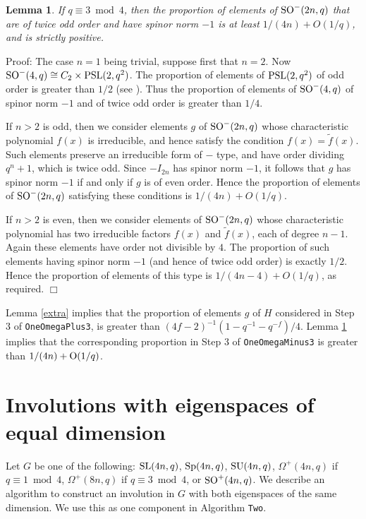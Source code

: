 \documentclass[12pt]{article}
\newtheorem{lemma}[definition]{Lemma}
\newenvironment{proof}{\normalsize {\sc Proof}:}{{\hfill $\Box$ \\}}
\def\O{{\rm O}}  %
\def\SL{{\rm SL}}
\def\SO{{\rm SO}}
\def\Oh{O}  %
\def\PSL{{\rm PSL}}
\def\Sp{{\rm Sp}}
\def\SU{{\rm SU}}
\begin{document}
\begin{lemma}\label{extra-minus}
If $q\equiv3\bmod4$, then the proportion of elements 
of $\SO^-(2n,q)$ that are
of twice odd order and have spinor norm $-1$ is at least $1/(4n)+\Oh(1/q)$,
and is strictly positive.
\end{lemma}
\begin{proof} 
The case $n=1$ being trivial, suppose first that $n=2$.  
Now $\SO^-(4,q)\cong C_2\times\PSL(2,q^2)$.
The proportion of elements of $\PSL(2,q^2)$ of odd order
is greater than $1/2$ (see \cite[p.\ 288]{Dornhoff}).  
Thus the proportion of elements of
$\SO^-(4,q)$ of spinor norm $-1$ and of twice odd order is
greater than $1/4$.

If $n>2$ is odd, then we consider elements 
$g$ of $\SO^-(2n,q)$ whose characteristic
polynomial $f(x)$ is irreducible, and hence satisfy the condition 
$f(x)=\tilde{f}(x)$.  Such elements preserve an irreducible form of
$-$ type, and have order dividing $q^n+1$, which is twice odd.  Since
$-I_{2n}$ has spinor norm $-1$, it follows that $g$ has spinor norm $-1$
if and only if $g$ is of even order.  Hence the proportion of elements of
$\SO^-(2n,q)$ satisfying these conditions is $1/(4n)+\Oh(1/q)$.

If $n>2$ is even, then we consider elements of $\SO^-(2n,q)$ whose
characteristic polynomial has two irreducible factors 
$f(x)$ and $\tilde{f}(x)$, each 
of degree $n-1$.  Again these elements have order not divisible by $4$.
The proportion of such elements having spinor norm $-1$ (and hence of 
twice odd order) is exactly $1/2$.  Hence the proportion of elements 
of this type is $1/(4n-4) +\Oh(1/q)$, as required.
\end{proof}

Lemma \ref{extra} implies that the 
proportion of elements $g$ of $H$
considered in Step 3 of {\tt OneOmegaPlus3}, 
is greater than $(4f-2)^{-1}(1-q^{-1}-q^{-f})/4$.
Lemma \ref{extra-minus} implies that the corresponding
proportion in Step 3 of {\tt OneOmegaMinus3}
is greater than $1/(4n)+\O(1/q)$.

\section{Involutions with eigenspaces of equal dimension}\label{Equal}
Let $G$ be one of the following:
$\SL(4n,q)$, $\Sp(4n,q)$, $\SU(4n,q)$, 
$\Omega^+(4n,q)$ if $q\equiv1\bmod4$,
$\Omega^+(8n,q)$ if $q\equiv3\bmod4$, or $\SO^+(4n,q)$.
We describe an algorithm to construct an 
involution in $G$ with both eigenspaces of the same dimension.
We use this as one component in Algorithm {\tt Two}.
\end{document}
